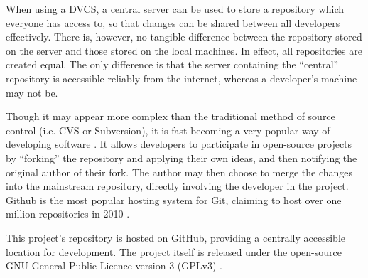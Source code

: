 When using a DVCS, a central server can be used to store a repository which
everyone has access to, so that changes can be shared between all developers
effectively. There is, however, no tangible difference between the repository
stored on the server and those stored on the local machines. In effect, all
repositories are created equal. The only difference is that the server
containing the ``central'' repository is accessible reliably from the internet,
whereas a developer's machine may not be.

Though it may appear more complex than the traditional method of source control
(i.e. CVS or Subversion), it is fast becoming a very popular way of developing
software \cite{takhteyev2010}. It allows developers to participate in
open-source projects by ``forking'' the repository and applying their own
ideas, and then notifying the original author of their fork. The author may
then choose to merge the changes into the mainstream repository, directly
involving the developer in the project. Github \cite{Github} is the most
popular hosting system for Git, claiming to host over one million repositories
in 2010 \cite{takhteyev2010}.

This project's repository is hosted on GitHub, providing a centrally accessible
location for development. The project itself is released under the open-source
GNU General Public Licence version 3 (GPLv3) \cite{stallman1991}.
